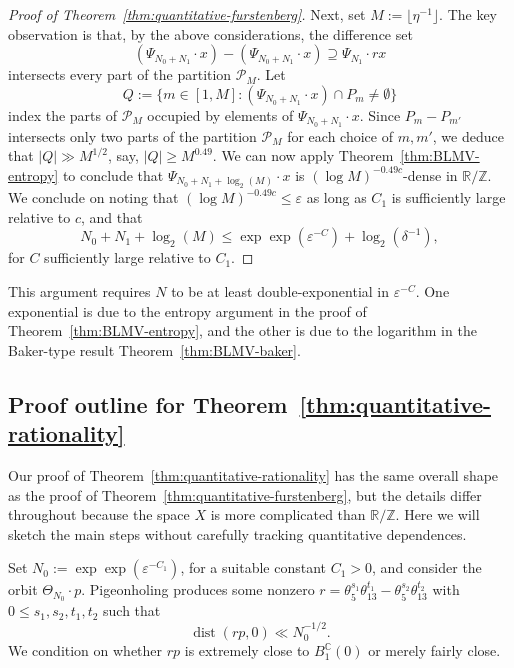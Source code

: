 \documentclass[11pt]{amsart}
\theoremstyle{definition}
\newcommand{\C}{{\mathbb C}}
\DeclareMathOperator{\dist}{dist}
\begin{document}
\begin{proof}[Proof of Theorem~\ref{thm:quantitative-furstenberg}]
Next, set $M:=\lfloor \eta^{-1} \rfloor$.  The key observation is that, by the above considerations, the difference set
$$(\Psi_{N_0+N_1} \cdot x)-(\Psi_{N_0+N_1} \cdot x) \supseteq \Psi_{N_1} \cdot rx$$
intersects every part of the partition $\mathcal{P}_M$.  Let
$$Q:=\{m \in [1,M]: (\Psi_{N_0+N_1} \cdot x) \cap P_m \neq \emptyset\}$$
index the parts of $\mathcal{P}_M$ occupied by elements of $\Psi_{N_0+N_1} \cdot x$.  Since $P_m-P_{m'}$ intersects only two parts of the partition $\mathcal{P}_M$ for each choice of $m,m'$, we deduce that $|Q| \gg M^{1/2}$, say, $|Q| \geq M^{0.49}$.  We can now apply Theorem~\ref{thm:BLMV-entropy} to conclude that $\Psi_{N_0+N_1+\log_2(M)} \cdot x$
is $(\log M)^{-0.49c}$-dense in $\mathbb{R}/\mathbb{Z}$.  We conclude on noting that $(\log M)^{-0.49c}\leq \varepsilon$ as long as $C_1$ is sufficiently large relative to $c$, and that
$$N_0+N_1+\log_2(M) \leq \exp\exp(\varepsilon^{-C})+\log_2(\delta^{-1}),$$
for $C$ sufficiently large relative to $C_1$.
\end{proof}

This argument requires $N$ to be at least double-exponential in $\varepsilon^{-C}$.  One exponential is due to the entropy argument in the proof of Theorem~\ref{thm:BLMV-entropy}, and the other is due to the logarithm in the Baker-type result Theorem~\ref{thm:BLMV-baker}.  %



\subsection{Proof outline for Theorem~\ref{thm:quantitative-rationality}}  Our proof of Theorem~\ref{thm:quantitative-rationality} has the same overall shape as the proof of Theorem~\ref{thm:quantitative-furstenberg}, but the details differ throughout because the space $X$ is more complicated than $\mathbb{R}/\mathbb{Z}$.  Here we will sketch the main steps without carefully tracking quantitative dependences.

Set $N_0:=\exp\exp(\varepsilon^{-C_1})$, for a suitable constant $C_1>0$, and consider the orbit $\Theta_{N_0} \cdot p$.  Pigeonholing produces some nonzero $r=\theta_5^{s_1}\theta_{13}^{t_1}-
\theta_5^{s_2}\theta_{13}^{t_2}$ with $0 \leq s_1,s_2,t_1,t_2$ such that
$$\dist(rp,0) \ll N_0^{-1/2}.$$
We condition on whether $rp$ is extremely close to $B^{\C}_1(0)$ or merely fairly close.
\end{document}

